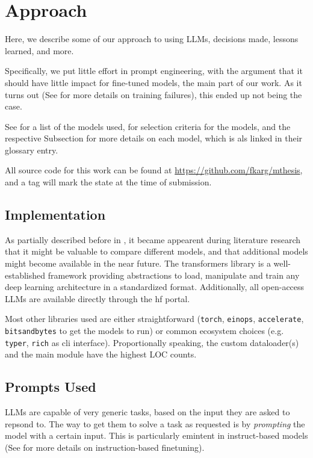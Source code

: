 \chapter{Approach}\label{chap:approach}
Here, we describe some of our approach to using \glspl{LLM}, decisions made, lessons learned, and more.

Specifically, we put little effort in prompt engineering, with the argument that it should have little impact for fine-tuned models, the main part of our work. As it turns out (See  for more details on training failures), this ended up not being the case.

See  for a list of the models used,  for selection criteria for the models, and the respective Subsection for more details on each model, which is als linked in their glossary entry.

All source code for this work can be found at \url{https://github.com/fkarg/mthesis}, and a tag will mark the state at the time of submission.

\section{Implementation}\label{sec:impl}
As partially described before in , it became appearent during literature research that it might be valuable to compare different models, and that additional models might become available in the near future.
The \acrlong{transformers} library is a well-established framework providing abstractions to load, manipulate and train any deep learning architecture in a standardized format.
Additionally, all open-access \glspl{LLM} are available directly through the \gls{hf} portal.

Most other libraries used are either straightforward (\texttt{torch}, \texttt{einops}, \texttt{accelerate}, \texttt{bitsandbytes} to get the models to run) or common ecosystem choices (e.g. \texttt{typer}, \texttt{rich} as cli interface).
Proportionally speaking, the custom dataloader(s) and the main module have the highest \gls{LOC} counts.



\section{Prompts Used}\label{sec:prompts}
\glspl{LLM} are capable of very generic tasks, based on the input they are asked to repsond to.
The way to get them to solve a task as requested is by \textit{prompting} the model with a certain input.
This is particularly emintent in instruct-based models (See  for more details on instruction-based finetuning).

